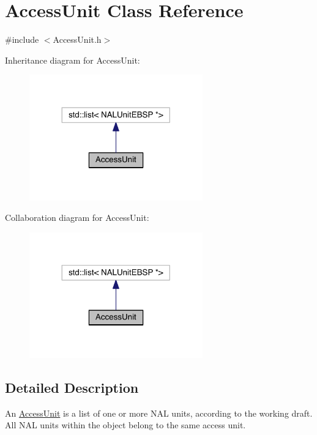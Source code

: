 \hypertarget{class_access_unit}{}\section{Access\+Unit Class Reference}
\label{class_access_unit}


{\ttfamily \#include $<$Access\+Unit.\+h$>$}



Inheritance diagram for Access\+Unit\+:
\nopagebreak
\begin{figure}[H]
\begin{center}
\leavevmode
\includegraphics[width=212pt]{d4/da5/class_access_unit__inherit__graph}
\end{center}
\end{figure}


Collaboration diagram for Access\+Unit\+:
\nopagebreak
\begin{figure}[H]
\begin{center}
\leavevmode
\includegraphics[width=212pt]{d3/d00/class_access_unit__coll__graph}
\end{center}
\end{figure}


\subsection{Detailed Description}
An \hyperlink{class_access_unit}{Access\+Unit} is a list of one or more N\+AL units, according to the working draft. All N\+AL units within the object belong to the same access unit.

